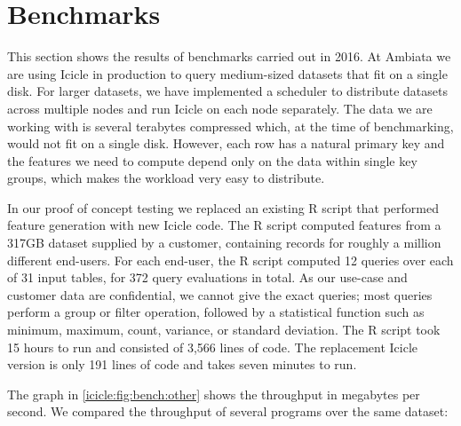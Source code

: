 \section{Benchmarks}
\label{icicle:s:Benchmarks}

This section shows the results of benchmarks carried out in 2016.
At Ambiata we are using Icicle in production to query medium-sized datasets that fit on a single disk.
For larger datasets, we have implemented a scheduler to distribute datasets across multiple nodes and run Icicle on each node separately.
The data we are working with is several terabytes compressed which, at the time of benchmarking, would not fit on a single disk.
However, each row has a natural primary key and the features we need to compute depend only on the data within single key groups, which makes the workload very easy to distribute.


In our proof of concept testing we replaced an existing R script that performed feature generation with new Icicle code.
The R script computed features from a 317GB dataset supplied by a customer, containing records for roughly a million different end-users.
For each end-user, the R script computed 12 queries over each of 31 input tables, for 372 query evaluations in total.
As our use-case and customer data are confidential, we cannot give the exact queries; most queries perform a group or filter operation, followed by a statistical function such as minimum, maximum, count, variance, or standard deviation.
The R script took 15 hours to run and consisted of 3,566 lines of code.
The replacement Icicle version is only 191 lines of code and takes seven minutes to run.



The graph in \cref{icicle:fig:bench:other} shows the throughput in megabytes per second.
We compared the throughput of several programs over the same dataset:

